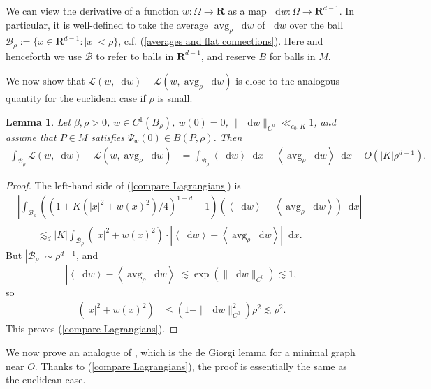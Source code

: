 \documentclass[final,12pt, leqno]{brownthesis}
\newcommand{\RR}{\mathbf{R}}
\DeclareMathOperator{\avg}{avg}
\newcommand*\dif{\mathop{}\!\mathrm{d}}
\newcommand{\Lagrange}{\mathscr L}
\def\Japan#1{\left \langle #1 \right \rangle}
\newtheorem{lemma}[theorem]{Lemma}
\theoremstyle{definition}
\numberwithin{equation}{section}
\begin{document}
We can view the derivative of a function $w: \Omega \to \RR$ as a map $\dif w: \Omega \to \RR^{d - 1}$.
In particular, it is well-defined to take the average $\avg_\rho \dif w$ of $\dif w$ over the ball $\mathscr B_\rho := \{x \in \RR^{d - 1}: |x| < \rho\}$, c.f. (\ref{averages and flat connections}).
Here and henceforth we use $\mathscr B$ to refer to balls in $\RR^{d - 1}$, and reserve $B$ for balls in $M$.

We now show that $\Lagrange(w, \dif w) - \Lagrange(w, \avg_\rho \dif w)$ is close to the analogous quantity for the euclidean case if $\rho$ is small.

\begin{lemma}
Let $\beta, \rho > 0$, $w \in C^1(B_\rho)$, $w(0) = 0$, $\|\dif w\|_{C^0} \ll_{c_0, K} 1$, and assume that $P \in M$ satisfies $\Psi_w(0) \in B(P, \rho)$. Then
\begin{align}
\int_{\mathscr B_\rho} \Lagrange(w, \dif w) - \Lagrange(w, \avg_\rho \dif w)
&= \int_{\mathscr B_\rho} \Japan{\dif w} \dif x - \Japan{\avg_\rho \dif w} \dif x + O(|K| \rho^{d + 1}) \label{compare Lagrangians}.
\end{align}
\end{lemma}
\begin{proof}
The left-hand side of (\ref{compare Lagrangians}) is
\begin{align*}
&\left|\int_{\mathscr B_\rho} ((1 + K(|x|^2 + w(x)^2)/4)^{1 - d} - 1)(\Japan{\dif w} - \Japan{\avg_\rho \dif w}) \dif x\right| \\
&\qquad \lesssim_d |K| \int_{\mathscr B_\rho} (|x|^2 + w(x)^2) \cdot \left|\Japan{\dif w} - \Japan{\avg_\rho \dif w}\right| \dif x.
\end{align*}
But $|\mathscr B_\rho| \sim \rho^{d - 1}$, and
$$|\Japan{\dif w} - \Japan{\avg_\rho \dif w}| \lesssim \exp(\|\dif w\|_{C^0}) \lesssim 1,$$
so
\begin{align*}
(|x|^2 + w(x)^2) &\leq (1 + \|\dif w\|_{C^0}^2) \rho^2 \lesssim \rho^2.
\end{align*}
This proves (\ref{compare Lagrangians}).
\end{proof}

We now prove an analogue of \cite[Lemma 6.3]{Giusti77}, which is the de Giorgi lemma for a minimal graph near $O$.
Thanks to (\ref{compare Lagrangians}), the proof is essentially the same as the euclidean case.
\end{document}

